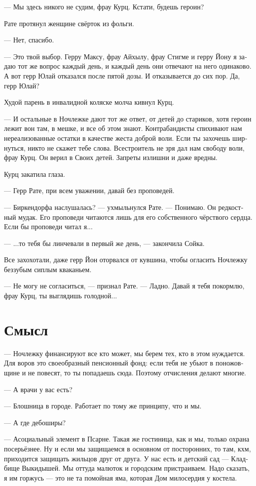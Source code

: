 \documentclass[a4paper,12pt,fleqn]{book}\usepackage{cooltooltips}\usepackage{polyglossia}\setdefaultlanguage[babelshorthands=true]{russian}\setotherlanguage{english}\defaultfontfeatures{Ligatures=TeX,Mapping=tex-text} \usepackage{xcolor}\definecolor{lightgray}{HTML}{bbbbbb}\color{lightgray}\newcommand{\ml}[3]{\textenglish{\textcolor{black}{#3}}}
\begin{document}
--- Мы здесь никого не судим, фрау Курц.
Кстати, будешь героин?

Рате протянул женщине свёрток из фольги.

--- Нет, спасибо.

--- Это твой выбор.
Герру Максу, фрау Айхылу, фрау Стигме и герру Йону я задаю тот же вопрос каждый день, и каждый день они отвечают на него одинаково.
А вот герр Юлай отказался после пятой дозы.
И отказывается до сих пор.
Да, герр Юлай?

Худой парень в инвалидной коляске молча кивнул Курц.

--- И остальные в Ночлежке дают тот же ответ, от детей до стариков, хотя героин лежит вон там, в мешке, и все об этом знают.
Контрабандисты спихивают нам нереализованные остатки в качестве жеста доброй воли.
Если ты захочешь ширнуться, никто не скажет тебе слова.
Всестроитель не зря дал нам свободу воли, фрау Курц.
Он верил в Своих детей.
Запреты излишни и даже вредны.

Курц закатила глаза.

--- Герр Рате, при всем уважении, давай без проповедей.

--- Биркендорфа наслушалась? --- ухмыльнулся Рате.
--- Понимаю.
Он редкостный мудак.
Его проповеди читаются лишь для его собственного чёрствого сердца.
Если бы проповеди читал я...

--- ...то тебя бы линчевали в первый же день, --- закончила Сойка.

Все захохотали, даже герр Йон оторвался от кувшина, чтобы огласить Ночлежку беззубым сиплым кваканьем.

--- Не могу не согласиться, --- признал Рате.
--- Ладно.
Давай я тебя покормлю, фрау Курц, ты выглядишь голодной...

\section{Смысл}

--- Ночлежку финансируют все кто может, мы берем тех, кто в этом нуждается.
Для воров это своеобразный пенсионный фонд: если тебя не убьют в поножовщине и не повесят, то ты попадаешь сюда.
Поэтому отчисления делают многие.

--- А врачи у вас есть?

--- Блошница в городе.
Работает по тому же принципу, что и мы.

--- А где дебоширы?

--- Асоциальный элемент в Псарне.
Такая же гостиница, как и мы, только охрана посерьёзнее.
Ну и если мы защищаемся в основном от посторонних, то там, кхм, приходится защищать жильцов друг от друга.
У нас есть и детский сад --- Кладбище Выкидышей.
Мы оттуда малюток и городским пристраиваем.
Надо сказать, я им горжусь --- это не та помойная яма, которая Дом милосердия у костела.
\end{document}
